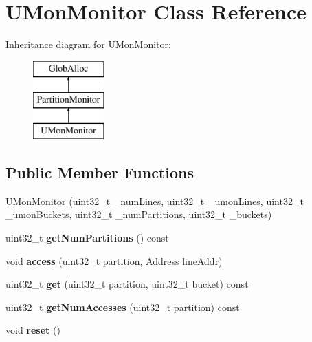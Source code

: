 \hypertarget{classUMonMonitor}{\section{U\-Mon\-Monitor Class Reference}
\label{classUMonMonitor}
}
Inheritance diagram for U\-Mon\-Monitor\-:\begin{figure}[H]
\begin{center}
\leavevmode
\includegraphics[height=3.000000cm]{classUMonMonitor}
\end{center}
\end{figure}
\subsection*{Public Member Functions}
\begin{DoxyCompactItemize}
\item 
\hyperlink{classUMonMonitor_a695c9d9dd2ffc4e565dee9a5201c4e54}{U\-Mon\-Monitor} (uint32\-\_\-t \-\_\-num\-Lines, uint32\-\_\-t \-\_\-umon\-Lines, uint32\-\_\-t \-\_\-umon\-Buckets, uint32\-\_\-t \-\_\-num\-Partitions, uint32\-\_\-t \-\_\-buckets)
\item 
\hypertarget{classUMonMonitor_a885626520f51a7775eb86ca93d62776c}{uint32\-\_\-t {\bfseries get\-Num\-Partitions} () const }\label{classUMonMonitor_a885626520f51a7775eb86ca93d62776c}

\item 
\hypertarget{classUMonMonitor_a6f0c0aad7db23d24d83c820958c49cf0}{void {\bfseries access} (uint32\-\_\-t partition, Address line\-Addr)}\label{classUMonMonitor_a6f0c0aad7db23d24d83c820958c49cf0}

\item 
\hypertarget{classUMonMonitor_ada5f47d3cd588a87b311623ce5a832fa}{uint32\-\_\-t {\bfseries get} (uint32\-\_\-t partition, uint32\-\_\-t bucket) const }\label{classUMonMonitor_ada5f47d3cd588a87b311623ce5a832fa}

\item 
\hypertarget{classUMonMonitor_a0790a248dd66d17d48c5e03e90710076}{uint32\-\_\-t {\bfseries get\-Num\-Accesses} (uint32\-\_\-t partition) const }\label{classUMonMonitor_a0790a248dd66d17d48c5e03e90710076}

\item 
\hypertarget{classUMonMonitor_a2775c56d25bffddbff76745844f756c7}{void {\bfseries reset} ()}\label{classUMonMonitor_a2775c56d25bffddbff76745844f756c7}

\end{DoxyCompactItemize}
